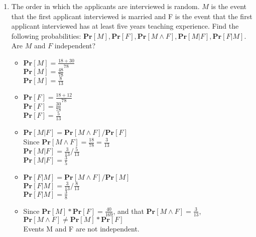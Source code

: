 \documentclass[11pt]{article}
\renewcommand{\Pr}{\ensuremath{\mathbf{Pr}}\xspace}
\begin{document}
\begin{description}
\begin{enumerate}
\begin{enumerate}
 \item
The order in which the applicants are interviewed is random.  $M$ is the event that the first applicant interviewed is married and F is the event that the first applicant interviewed has at least five years teaching experience.  Find the following probabilities: $\Pr[M], \Pr[F], \Pr[M\wedge F], \Pr[M|F], \Pr[F|M]$.  Are $M$ and $F$ independent?
	\begin{itemize}
	\item
	$\Pr[M] = \frac{18+30}{78}$ \\
	$\Pr[M] = \frac{48}{78}$ \\
	$\Pr[M] = \frac{8}{13}$ \\
	\item
	$\Pr[F] = \frac{18+12}{78}$ \\
	$\Pr[F] = \frac{30}{78}$ \\
	$\Pr[F] = \frac{5}{13}$ \\
	\item
	$\Pr[M | F] = \Pr[M \wedge F] / \Pr[F]$ \\
	Since $\Pr[M \wedge F] = \frac{18}{78} = \frac{3}{13}$ \\
	$\Pr[M | F] = \frac{3}{13} / \frac{5}{13}$ \\
	$\Pr[M | F] = \frac{3}{5}$ \\
	\item
	$\Pr[F | M] = \Pr[M \wedge F] / \Pr[M]$ \\
	$\Pr[F | M] = \frac{3}{13} / \frac{8}{13}$ \\
	$\Pr[F | M] = \frac{3}{8}$ \\
	\item
	Since $\Pr[M] * \Pr[F] = \frac{40}{169}$, and that
	$\Pr[M \wedge F] = \frac{3}{13}$, \\
	$\Pr[M \wedge F] \neq \Pr[M] * \Pr[F]$ \\
	Events M and F are not independent. \\
	\end{itemize}


\end{enumerate}
\end{enumerate}
\end{description}
\end{document}
